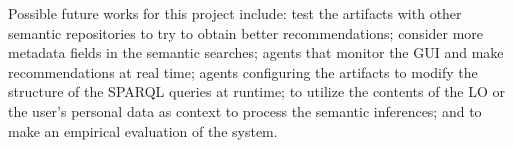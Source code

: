 \documentclass[a4paper,twoside]{article}
\begin{document}
Possible future works for this project include: test the artifacts with other semantic repositories to try to obtain better recommendations; consider more metadata fields in the semantic searches; agents that monitor the GUI and make recommendations at real time; agents configuring the artifacts to modify the structure of the SPARQL queries at runtime; to utilize the contents of the LO or the user's personal data as context to process the semantic inferences; and to make an empirical evaluation of the system.

\vfill

{\small
}

\vfill
\end{document}

